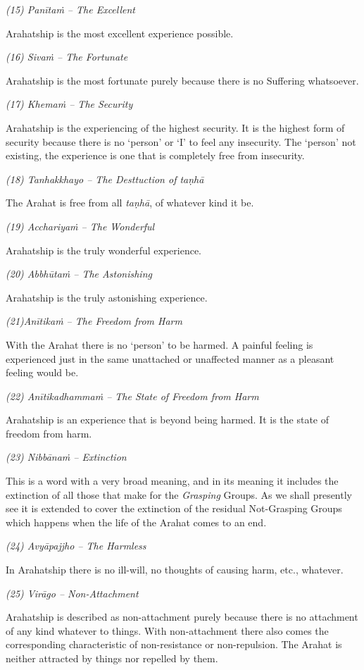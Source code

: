 \emph{(15) Panītaṁ -- The Excellent}

Arahatship is the most excellent experience possible.

\emph{(16) Sivaṁ -- The Fortunate}

Arahatship is the most fortunate purely because there is no Suffering whatsoever.

\emph{(17) Khemaṁ -- The Security}

Arahatship is the experiencing of the highest security. It is the highest form of security because there is no `person' or `I' to feel any insecurity. The `person' not existing, the experience is one that is completely free from insecurity.

\emph{(18) Tanhakkhayo -- The Desttuction of taṇhā}

The Arahat is free from all \textit{taṇhā}, of whatever kind it be.

\emph{(19) Acchariyaṁ -- The Wonderful}

Arahatship is the truly wonderful experience.

\emph{(20) Abbhūtaṁ -- The Astonishing}

Arahatship is the truly astonishing experience.

\emph{(21)Anītikaṁ -- The Freedom from Harm}

With the Arahat there is no `person' to be harmed. A painful feeling is experienced just in the same unattached or unaffected manner as a pleasant feeling would be.

\emph{(22) Anītikadhammaṁ -- The State of Freedom from Harm}

Arahatship is an experience that is beyond being harmed. It is the state of freedom from harm.

\emph{(23) Nibbānaṁ -- Extinction}

This is a word with a very broad meaning, and in its meaning it includes the extinction of all those that make for the \emph{Grasping} Groups. As we shall presently see it is extended to cover the extinction of the residual Not-Grasping Groups which happens when the life of the Arahat comes to an end.

\emph{(24) Avyāpajjho -- The Harmless}

In Arahatship there is no ill-will, no thoughts of causing harm, etc., whatever.

\emph{(25) Virāgo -- Non-Attachment}

Arahatship is described as non-attachment purely because there is no attachment of any kind whatever to things. With non-attachment there also comes the corresponding characteristic of non-resistance or non-repulsion. The Arahat is neither attracted by things nor repelled by them.

